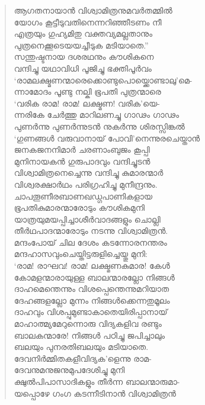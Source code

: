 \begin{verse}
ആഗതനായാന്‍ വിശ്വാമിത്രനുമവര്‍തമ്മില്‍\\
യോഗം കൂട്ടീടുവതിനെന്നറിഞ്ഞീടണം നീ\\
എത്രയും ഗുഹ്യമിതു വക്തവ്യമല്ലതാനും\\
പുത്രനെക്കൂടെയയച്ചീടുക മടിയാതെ.”\\
സന്തുഷ്ടനായ ദശരഥനും കൗശികനെ\\
വന്ദിച്ചു യഥാവിധി പൂജിച്ചു ഭക്തിപൂര്‍വം\\
‘രാമലക്ഷ്മണന്മാരെക്കൊണ്ടുപൊയ്ക്കൊണ്ടാലു’മെ-\\
ന്നാമോദം പൂണ്ടു നല്കി ഭൂപതി പുത്രന്മാരെ\\
‘വരിക രാമ! രാമ! ലക്ഷ്മണ! വരിക’യെ-\\
ന്നരികേ ചേര്‍ത്തു മാറിലണച്ചു ഗാഢം ഗാഢം\\
പുണര്‍ന്നു പുണര്‍ന്നുടന്‍ നുകര്‍ന്നു ശിരസ്സിങ്കല്‍\\
‘ഗുണങ്ങള്‍ വരുവാനായ് പോവി’നെന്നുരചെയ്താന്‍\\
ജനകജനനിമാര്‍ ചരണാംബുജം കൂപ്പി\\
മുനിനായകന്‍ ഗുരുപാദവും വന്ദിച്ചുടന്‍\\
വിശ്വാമിത്രനെച്ചെന്നു വന്ദിച്ചു കുമാരന്മാര്‍\\
വിശ്വരക്ഷാര്‍ഥം പരിഗ്രഹിച്ചു മുനീന്ദ്രനും.\\
ചാപതൂണീരബാണഖഡ്ഗപാണികളായ\\
ഭൂപതികുമാരന്മാരോടും കൗശികമുനി\\
യാത്രയുമയപ്പിച്ചാശീര്‍വാദങ്ങളും ചൊല്ലി\\
തീര്‍ഥപാദന്മാരോടും നടന്നു വിശ്വാമിത്രന്‍.\\
മന്ദംപോയ് ചില ദേശം കടന്നോരനന്തരം\\
മന്ദഹാസവുംചെയ്തിട്ടരുളിച്ചെയ്തു മുനി:\\
‘രാമ! രാഘവ! രാമ! ലക്ഷ്മണകുമാര! കേള്‍\\
കോമളന്മാരായുള്ള ബാലന്മാരല്ലോ നിങ്ങള്‍\\
ദാഹമെന്തെന്നും വിശപ്പെന്തെന്നുമറിയാത\\
ദേഹങ്ങളല്ലോ മുന്നം നിങ്ങള്‍ക്കെന്നതുമൂലം\\
ദാഹവും വിശപ്പുമുണ്ടാകാതെയിരിപ്പാനായ്\\
മാഹാത്മ്യമേറുന്നൊരു വിദ്യകളിവ രണ്ടും\\
ബാലകന്മാരേ! നിങ്ങള്‍ പഠിച്ചു ജപിച്ചാലും\\
ബലയും പുനരതിബലയും മടിയാതെ.\\
ദേവനിര്‍മ്മിതകളീവിദ്യക’ളെന്നു രാമ-\\
ദേവനുമനുജനുമുപദേശിച്ചു മുനി\\
ക്ഷുല്‍പിപാസാദികളും തീര്‍ന്ന ബാലന്മാരുമാ-\\
യപ്പൊഴേ ഗംഗ കടന്നീടിനാന്‍ വിശ്വാമിത്രന്‍
\end{verse}

